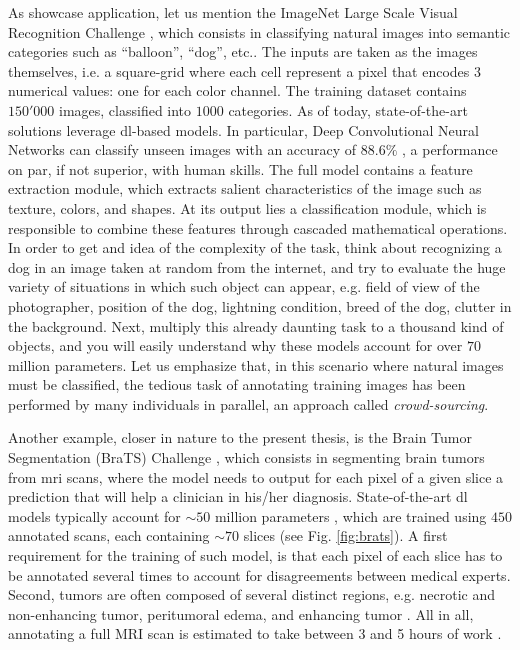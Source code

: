 As showcase application, let us mention the ImageNet Large Scale Visual Recognition Challenge \cite{ILSVRC15}, which consists in classifying natural images into semantic categories such as ``balloon'', ``dog'', etc..
The inputs are taken as the images themselves, i.e. a square-grid where each cell represent a pixel that encodes $3$ numerical values: one for each color channel.
The training dataset contains $150'000$ images, classified into $1000$ categories.
As of today, state-of-the-art solutions leverage \gls{dl}-based models.
In particular, Deep Convolutional Neural Networks can classify unseen images with an accuracy of $88.6\%$ \cite{tan19}, a performance on par, if not superior, with human skills.
The full model contains a feature extraction module, which extracts salient characteristics of the image such as texture, colors, and shapes.
At its output lies a classification module, which is responsible to combine these features through cascaded mathematical operations.
In order to get and idea of the complexity of the task, think about recognizing a dog in an image taken at random from the internet, and try to evaluate the huge variety of situations in which such object can appear, e.g. field of view of the photographer, position of the dog, lightning condition, breed of the dog, clutter in the background.
Next, multiply this already daunting task to a thousand kind of objects, and you will easily understand why these models account for over $70$ million parameters.
Let us emphasize that, in this scenario where natural images must be classified, the tedious task of annotating training images has been performed by many individuals in parallel, an approach called \textit{crowd-sourcing}.

Another example, closer in nature to the present thesis, is the Brain Tumor Segmentation (BraTS) Challenge \cite{menze15}, which consists in segmenting brain tumors from \gls{mri} scans, where the model needs to output for each pixel of a given slice a prediction that will help a clinician in his/her diagnosis.
State-of-the-art \gls{dl} models typically account for $\sim 50$ million parameters \cite{chen19}, which are trained using $450$ annotated scans, each containing $\sim 70$ slices (see Fig. \ref{fig:brats}).
A first requirement for the training of such model, is that each pixel of each slice has to be annotated several times to account for disagreements between medical experts.
Second, tumors are often composed of several distinct regions, e.g. necrotic and non-enhancing tumor, peritumoral edema, and enhancing tumor \cite{akil20}.
All in all, annotating a full MRI scan is estimated to take between 3 and 5 hours of work \cite{kaus01}.


